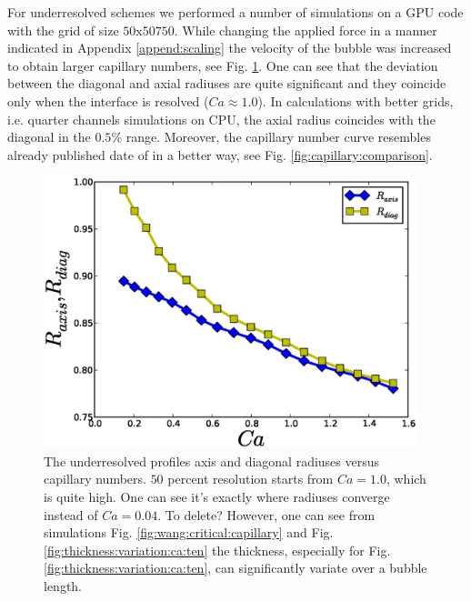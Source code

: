 \documentclass{article}
\begin{document}
For underresolved schemes we performed a number of simulations on a GPU code with the grid of size
$50\mathrm{x}50\mathrm{750}$. While changing the applied force in a manner indicated in Appendix
\ref{append:scaling} the velocity of the bubble was increased to obtain larger capillary numbers,
see Fig. \ref{fig:underresolved:capillaries}. One can see that the deviation between the diagonal
and axial radiuses are quite significant and they coincide only when the interface is resolved
($Ca\approx 1.0$). In calculations with better grids, i.e. quarter channels simulations on CPU, the
axial radius coincides with the diagonal in the $0.5\%$ range. Moreover, the capillary number curve
resembles already published date of \citet{heil-threedim} in a better way, see Fig.
\ref{fig:capillary:comparison}. 
\begin{figure}[ht]
\includegraphics[width=0.97\textwidth]{Figures/underresolved_capillaries.eps}
\caption{The underresolved profiles axis and diagonal radiuses versus capillary numbers. $50$
percent resolution starts from $Ca=1.0$, which is quite high. One can see it's exactly where
radiuses converge instead of $Ca=0.04$. {\color{red} To delete? However, one can see from
simulations Fig.
\ref{fig:wang:critical:capillary} and Fig.\ref{fig:thickness:variation:ca:ten} the thickness,
especially for Fig.\ref{fig:thickness:variation:ca:ten}, can significantly variate over a bubble
length.} \label{fig:underresolved:capillaries}}
\end{figure}
\end{document}
